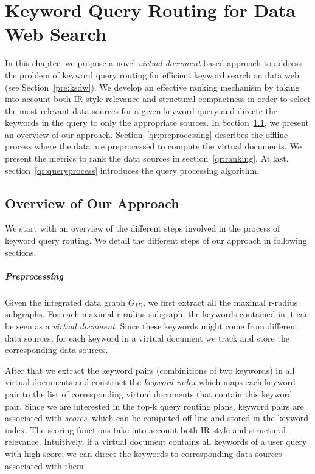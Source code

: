 \chapter{Keyword Query Routing for Data Web Search}\label{qr}

In this chapter, we propose a novel \emph{virtual document} based approach to address the problem of
keyword query routing for efficient keyword search on data web (see Section~\ref{pre:ksdw}). We
develop an effective ranking mechanism by taking into account both IR-style relevance and structural
compactness in order to select the most relevant data sources for a given keyword query and directe
the keywords in the query to only the appropriate sources. In Section~\ref{qr:overview}, we present
an overview of our approach. Section~\ref{qr:preprocessing} describes the offline process where the
data are preprocessed to compute the virtual documents. We present the metrics to rank the data
sources in section~\ref{qr:ranking}. At last, section~\ref{qr:queryprocess} introduces the query
processing algorithm.

\section{Overview of Our Approach}\label{qr:overview}
We start with an overview of the different steps involved in the process of keyword query routing. We
detail the different steps of our approach in following sections.

\paragraph{Preprocessing}
Given the integrated data graph $G_{ID}$, we first extract all the maximal r-radius subgraphs.
For each maximal r-radius subgraph, the keywords contained in it can be seen as a {\em virtual
document}. Since these keywords might come from different data sources, for each keyword in a
virtual document we track and store the corresponding data sources.

After that we extract the keyword pairs (combinitions of two keywords) in all virtual documents and
construct the {\em keyword index} which maps each keyword pair to the list of corresponding virtual
documents that contain this keyword pair. Since we are interested in the top-k query routing
plans, keyword pairs are associated with {\em scores}, which can be computed off-line and stored in the
keyword index. The scoring functions take into account both IR-style and structural relevance.
Intuitively, if a virtual document contains all keywords of a user query with high score, we can
direct the keywords to corresponding data sources associated with them. 

